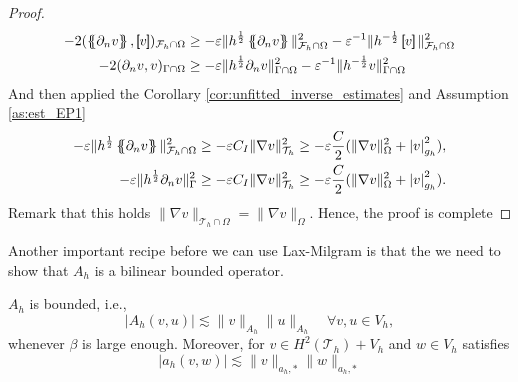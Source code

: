 \begin{proof}
\[\begin{split}
         - 2( \mean{ \partial _{n} v  },  \jump{ v })_{\mathcal{F} _{h} \cap \Omega } &\ge - \varepsilon \| h^{\frac{1}{2}}  \mean{  \partial _{n} v}      \|_{ \mathcal{F} _{h} \cap \Omega  }^{2  }
  - \varepsilon ^{-1} \| h^{-\frac{1}{2}} \jump{ v }   \|_{\mathcal{F} _{h} \cap \Omega   }^{ 2 } \\
- 2 ( \partial _{n} v,v)_{\Gamma \cap \Omega }   &\ge- \varepsilon \| h^{\frac{1}{2}} \partial _{n} v \|_{ \Gamma \cap \Omega  }^{2  }
-  \varepsilon ^{-1} \| h^{-\frac{1}{2}} v \|_{  \Gamma \cap  \Omega }^{ 2 }
     \end{split}
 \]
 And then applied the Corollary \ref{cor:unfitted_inverse_estimates} and Assumption \ref{as:est_EP1} \[
     \begin{split}
         - \varepsilon \| h^{\frac{1}{2}}  \left\{\!\!\left\{  \partial _{n} v\right\}\!\!\right\}      \|_{ \mathcal{F} _{h} \cap \Omega  }^{2  } \ge   - \varepsilon C_{I }  \|\nabla v  \|_{ \mathcal{T}_{h}  }^{2  } \ge -\varepsilon \frac{C}{2} ( \|\nabla v  \|_{ \Omega}^{2} +  \left\lvert 
         v \right\rvert  _{g_{h}  }^{  2}  ),  \\
    - \varepsilon \| h^{\frac{1}{2}}    \partial _{n} v      \|_{ \Gamma   }^{2  } \ge   - \varepsilon C_{I }  \|\nabla v  \|_{ \mathcal{T}_{h}  }^{2  } \ge -\varepsilon \frac{C}{2} ( \|\nabla v  \|_{ \Omega}^{2} +  \left\lvert  v  \right\rvert  _{g_{h}  }^{ 2 }  ). \\
     \end{split}
 \]
 Remark that this holds $\| \nabla v \|_{ \mathcal{T} _{h}\cap \Omega  }^{  }  = \| \nabla v \|_{ \Omega  }^{  } $. Hence, the proof is complete



\end{proof}
Another important recipe before we can use Lax-Milgram is that the we need to show that $A_{h} $ is a bilinear bounded operator.

\begin{lemma}
    \label{lemma:Ah_bounded}
    $A_{h}$ is bounded, i.e.,
    $$ \left\lvert A_{h}( v,u) \right\rvert \lesssim \| v \|_{A_{h}  }^{  }     \| u \|_{A_{h}  }^{  } \quad  \forall v,u \in V _{h}, $$
    whenever $\beta $ is large enough. Moreover, for $v \in  H^{2}( \mathcal{T}_{h} ) + V_{h} $
    and $w \in V_{h}$ satisfies \[
    \left\lvert a_{h}( v,w) \right\rvert  \lesssim \| v \|_{ a_{h},* }^{  }  \| w \|_{ a_{h},* }^{  }
    \]
\end{lemma}

